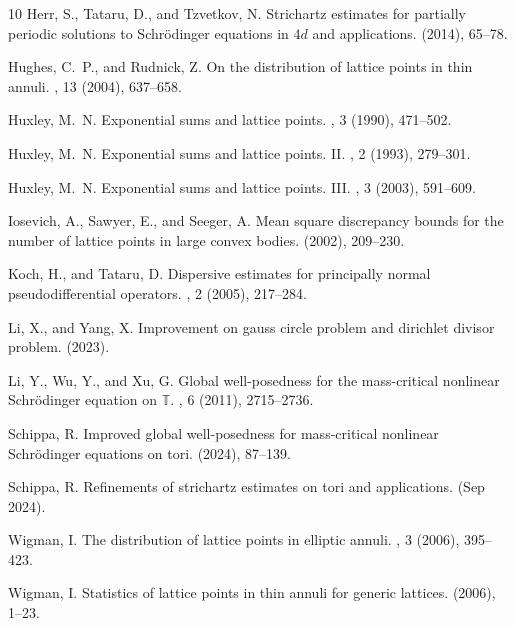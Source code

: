 \documentclass[12pt, letterpaper]{amsart}
\begin{document}
\begin{thebibliography}{10}
    {\sc Herr, S., Tataru, D., and Tzvetkov, N.}
    \newblock Strichartz estimates for partially periodic solutions to
      {S}chr\"odinger equations in {$4d$} and applications.
     (2014), 65--78.
    
    {\sc Hughes, C.~P., and Rudnick, Z.}
    \newblock On the distribution of lattice points in thin annuli.
    , 13 (2004), 637--658.
    
    {\sc Huxley, M.~N.}
    \newblock Exponential sums and lattice points.
    , 3 (1990), 471--502.
    
    {\sc Huxley, M.~N.}
    \newblock Exponential sums and lattice points. {II}.
    , 2 (1993), 279--301.
    
    {\sc Huxley, M.~N.}
    \newblock Exponential sums and lattice points. {III}.
    , 3 (2003), 591--609.
    
    {\sc Iosevich, A., Sawyer, E., and Seeger, A.}
    \newblock Mean square discrepancy bounds for the number of lattice points in
      large convex bodies.
     (2002), 209--230.
    
    {\sc Koch, H., and Tataru, D.}
    \newblock Dispersive estimates for principally normal pseudodifferential
      operators.
    , 2 (2005), 217--284.
    
    {\sc Li, X., and Yang, X.}
    \newblock Improvement on gauss circle problem and dirichlet divisor problem.
     (2023).
    
    {\sc Li, Y., Wu, Y., and Xu, G.}
    \newblock Global well-posedness for the mass-critical nonlinear
      {S}chr\"{o}dinger equation on {$\mathbb{T}$}.
    , 6 (2011), 2715--2736.
    
    {\sc Schippa, R.}
    \newblock Improved global well-posedness for mass-critical nonlinear
      {S}chr\"odinger equations on tori.
     (2024), 87--139.
    
    {\sc Schippa, R.}
    \newblock Refinements of strichartz estimates on tori and applications.
     (Sep 2024).
    
    {\sc Wigman, I.}
    \newblock The distribution of lattice points in elliptic annuli.
    , 3 (2006), 395--423.
    
    {\sc Wigman, I.}
    \newblock Statistics of lattice points in thin annuli for generic lattices.
     (2006), 1--23.
    
\end{thebibliography}
\end{document}
